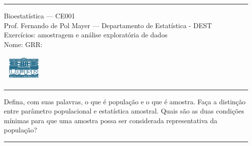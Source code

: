 \documentclass[a4paper,11pt,fleqn]{article}\usepackage[]{graphicx}\usepackage[]{color}
\theoremstyle{definition}
\begin{document}
\reversemarginpar %





\hrule
\vspace{0.3cm}

\begin{minipage}[c]{.85\textwidth}
  Bioestatística --- CE001 \\
  Prof. Fernando de Pol Mayer --- Departamento de Estatística - DEST \\
  Exercícios: amostragem e análise exploratória de dados \\
  Nome:  \hfill GRR: \hspace{2cm}
\end{minipage}\hfill
\begin{minipage}[c]{.15\textwidth}
\flushright
\includegraphics[width=2.2cm]{../img/ufpr-logo.png}
\end{minipage}

\vspace{0.3cm}
\hrule
\vspace{0.3cm}

\begin{compactenum}[1.]
\item Defina, com suas palavras, o que é população e o que é
  amostra. Faça a distinção entre parâmetro populacional e estatística
  amostral. Quais são as duas condições mínimas para que uma amostra
  possa ser considerada representativa da população?
\end{compactenum}

\vspace{0.3cm}
\hrule
\vspace{0.3cm}
\end{document}
